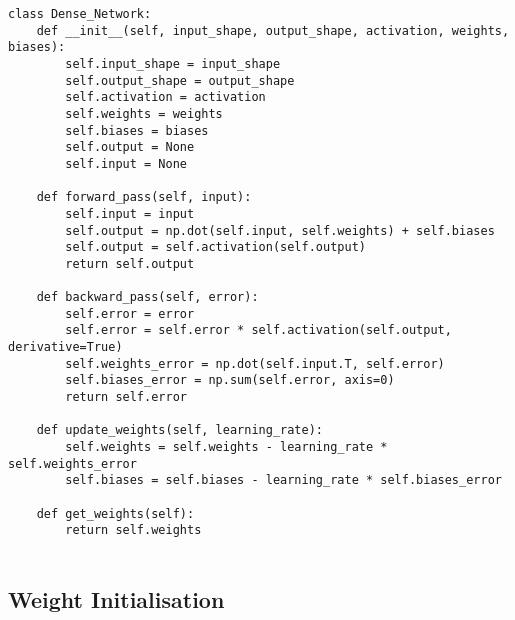 \documentclass{article}
\begin{document}
\begin{lstlisting}
class Dense_Network:
    def __init__(self, input_shape, output_shape, activation, weights, biases):
        self.input_shape = input_shape
        self.output_shape = output_shape
        self.activation = activation
        self.weights = weights
        self.biases = biases
        self.output = None
        self.input = None

    def forward_pass(self, input):
        self.input = input
        self.output = np.dot(self.input, self.weights) + self.biases
        self.output = self.activation(self.output)
        return self.output

    def backward_pass(self, error):
        self.error = error
        self.error = self.error * self.activation(self.output, derivative=True)
        self.weights_error = np.dot(self.input.T, self.error)
        self.biases_error = np.sum(self.error, axis=0)
        return self.error

    def update_weights(self, learning_rate):
        self.weights = self.weights - learning_rate * self.weights_error
        self.biases = self.biases - learning_rate * self.biases_error

    def get_weights(self):
        return self.weights


\end{lstlisting}

\clearpage


\subsection{Weight Initialisation}
\end{document}
